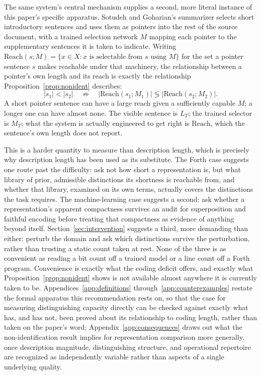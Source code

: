 \documentclass[11pt]{article}
\theoremstyle{plain}
\begin{document}
The same system's central mechanism supplies a second, more literal instance of this paper's specific apparatus. Sotudeh and Goharian's summarizer selects short introductory sentences and uses them as pointers into the rest of the source document, with a trained selection network $M$ mapping each pointer to the supplementary sentences it is taken to indicate. Writing $\mathrm{Reach}(s;M) = \{x \in X : x \text{ is selectable from } s \text{ using } M\}$ for the set a pointer sentence $s$ makes reachable under that machinery, the relationship between a pointer's own length and its reach is exactly the relationship Proposition~\ref{prop:nonident} describes:
\[
|s_1| < |s_2| \quad \not\Rightarrow \quad |\mathrm{Reach}(s_1; M_1)| \lessgtr |\mathrm{Reach}(s_2; M_2)|.
\]
A short pointer sentence can have a large reach given a sufficiently capable $M$; a longer one can have almost none. The visible sentence is $L_T$; the trained selector is $M_T$; what the system is actually engineered to get right is $\mathrm{Reach}$, which the sentence's own length does not report.

This is a harder quantity to measure than description length, which is precisely why description length has been used as its substitute. The Forth case suggests one route past the difficulty: ask not how short a representation is, but what library of prior, admissible distinctions its shortness is reachable from, and whether that library, examined on its own terms, actually covers the distinctions the task requires. The machine-learning case suggests a second: ask whether a representation's apparent compactness survives an audit for superposition and faithful encoding before treating that compactness as evidence of anything beyond itself. Section~\ref{sec:intervention} suggests a third, more demanding than either: perturb the domain and ask which distinctions survive the perturbation, rather than trusting a static count taken at rest. None of the three is as convenient as reading a bit count off a trained model or a line count off a Forth program. Convenience is exactly what the coding deficit offers, and exactly what Proposition~\ref{prop:nonident} shows is not available almost anywhere it is currently taken to be. Appendices~\ref{app:definitions} through~\ref{app:counterexamples} restate the formal apparatus this recommendation rests on, so that the case for measuring distinguishing capacity directly can be checked against exactly what has, and has not, been proved about its relationship to coding length, rather than taken on the paper's word; Appendix~\ref{app:consequences} draws out what the non-identification result implies for representation comparison more generally, once description magnitude, distinguishing structure, and operational repertoire are recognized as independently variable rather than aspects of a single underlying quality.
\end{document}
